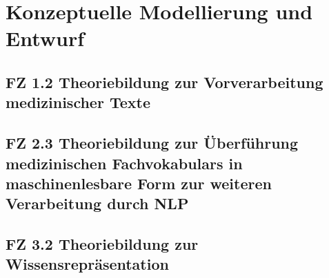 \chapter{Konzeptuelle Modellierung und Entwurf}
\label{ch:modellierung}


\section{FZ 1.2 Theoriebildung zur Vorverarbeitung medizinischer Texte}
\label{sec:FZ1.2} 

\section{FZ 2.3 Theoriebildung zur Überführung medizinischen Fachvokabulars in maschinenlesbare Form zur weiteren Verarbeitung durch NLP}
\label{sec:FZ2.3} 

\section{FZ 3.2 Theoriebildung zur Wissensrepräsentation}
\label{sec:FZ3.2} 
